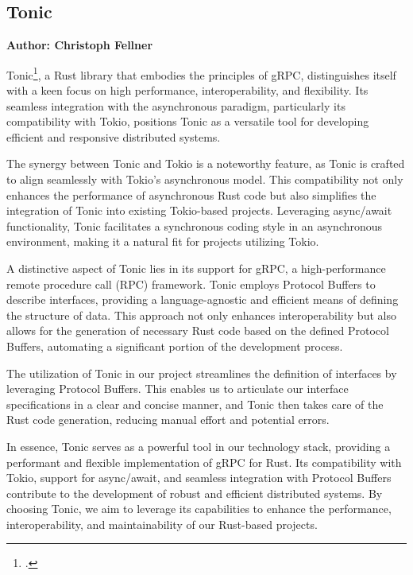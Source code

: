 \subsection{Tonic}
\textbf{Author: Christoph Fellner}

Tonic\footcite{tonic}, a Rust library that embodies the principles of gRPC, distinguishes itself with a keen focus on high performance, interoperability, and 
flexibility. Its seamless integration with the asynchronous paradigm, particularly its compatibility with Tokio, positions Tonic as a versatile tool for 
developing efficient and responsive distributed systems.\newline

The synergy between Tonic and Tokio is a noteworthy feature, as Tonic is crafted to align seamlessly with Tokio's asynchronous model. This compatibility not 
only enhances the performance of asynchronous Rust code but also simplifies the integration of Tonic into existing Tokio-based projects. Leveraging async/await 
functionality, Tonic facilitates a synchronous coding style in an asynchronous environment, making it a natural fit for projects utilizing Tokio.\newline

A distinctive aspect of Tonic lies in its support for gRPC, a high-performance remote procedure call (RPC) framework. Tonic employs Protocol Buffers to describe 
interfaces, providing a language-agnostic and efficient means of defining the structure of data. This approach not only enhances interoperability but also 
allows for the generation of necessary Rust code based on the defined Protocol Buffers, automating a significant portion of the development process.\newline

The utilization of Tonic in our project streamlines the definition of interfaces by leveraging Protocol Buffers. This enables us to articulate our interface 
specifications in a clear and concise manner, and Tonic then takes care of the Rust code generation, reducing manual effort and potential errors.\newline

In essence, Tonic serves as a powerful tool in our technology stack, providing a performant and flexible implementation of gRPC for Rust. Its compatibility with 
Tokio, support for async/await, and seamless integration with Protocol Buffers contribute to the development of robust and efficient distributed systems. By 
choosing Tonic, we aim to leverage its capabilities to enhance the performance, interoperability, and maintainability of our Rust-based projects.\newline

